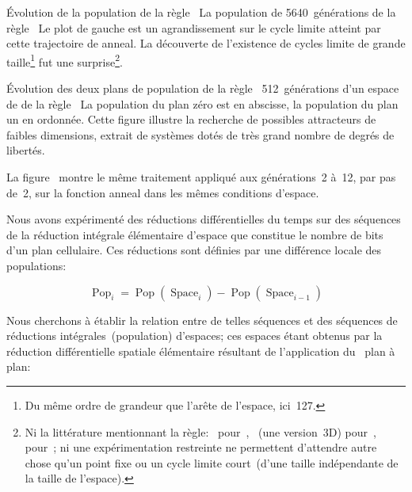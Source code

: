 %
{Évolution de la population de la règle~}%
{La population de 5640~générations de la règle~}%
{Le plot de gauche est un agrandissement sur le cycle limite atteint par
  cette trajectoire de anneal. %
  La découverte de l'existence de cycles limite de grande
  taille\footnote{%
    Du même ordre de grandeur que l'arête de l'espace, ici~127. %
    } %
  fut une surprise\footnote{%
    Ni la littérature mentionnant la règle:~%
     pour~\cite{Vichniac86}, %
    ~(une version~3D) pour~\cite{Pickover92b}, %
     pour~\cite{Toffoli87}; %
    ni une expérimentation restreinte ne permettent d'attendre autre
    chose qu'un point fixe ou un cycle limite court~(\ie d'une taille
    indépendante de la taille de l'espace).}. %
  }

%
{Évolution des deux plans de population de la règle~}
{512~générations d'un espace de  de la règle~}
{La population du plan zéro est en abscisse, la population du plan un
  en ordonnée. %
  Cette figure illustre la recherche de possibles attracteurs de
  faibles dimensions, extrait de systèmes dotés de très grand nombre de
  degrés de libertés. %
  }

\noindent%
La figure~ montre le même traitement
appliqué aux générations~2 à~12, par pas de~2, sur la fonction anneal
dans les mêmes conditions d'espace. %

Nous avons expérimenté des réductions différentielles du temps sur des
séquences de la réduction intégrale élémentaire d'espace que constitue
le nombre de bits d'un plan cellulaire. %
Ces réductions sont définies par une différence locale des
populations: %

\newcommand{\pop}{\operatorname{Pop}}
\newcommand{\spac}{\operatorname{Space}}

\[\pop_{i}=\pop(\spac_{i})-\pop(\spac_{i-1})\]

Nous cherchons à établir la relation entre de telles séquences et des
séquences de réductions intégrales~(population) d'espaces; %
ces espaces étant obtenus par la réduction différentielle spatiale
élémentaire résultant de l'application du \xor\ plan à plan:

